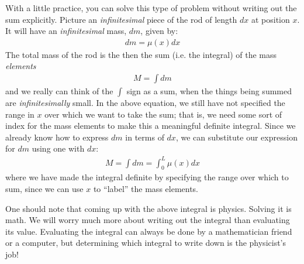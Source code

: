 With a little practice, you can solve this type of problem without writing out the sum explicitly. Picture an \textit{infinitesimal} piece of the rod of length $dx$ at position $x$. It will have an \textit{infinitesimal} mass, $dm$, given by:
\begin{align*}
dm = \mu(x) dx
\end{align*}
The total mass of the rod is the then the sum (i.e. the integral) of the mass \textit{elements}
\begin{align*}
M = \int dm
\end{align*}
and we really can think of the $\int$ sign as a sum, when the things being summed are \textit{infinitesimally} small. In the above equation, we still have not specified the range in $x$ over which we want to take the sum; that is, we need some sort of index for the mass elements to make this a meaningful definite integral. Since we already know how to express $dm$ in terms of $dx$, we can substitute our expression for $dm$ using one with $dx$:
\begin{align*}
M = \int dm = \int_0^L \mu(x) dx
\end{align*}
where we have made the integral definite by specifying the range over which to sum, since we can use $x$ to ``label'' the mass elements.

One should note that coming up with the above integral is physics. Solving it is math. We will worry much more about writing out the integral than evaluating its value. Evaluating the integral can always be done by a mathematician friend or a computer, but determining which integral to write down is the physicist's job!



